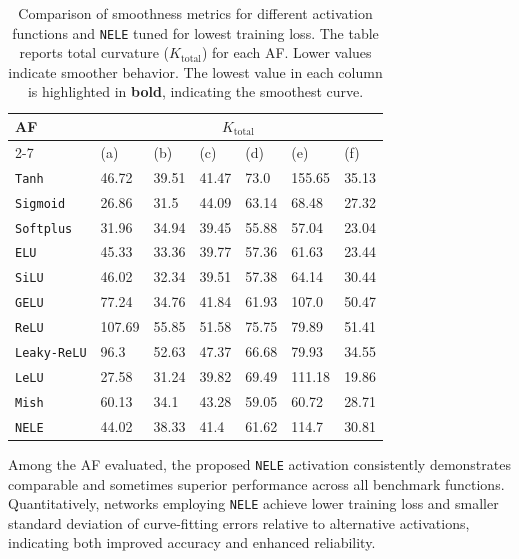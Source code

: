 \documentclass[11pt]{article}
\begin{document}
\begin{table}[h!]
\centering
\begin{tabular}{|l|llllll|}
\hline
\bfseries AF & \multicolumn{6}{c|}{\bfseries $K_\text{total}$} \\
\cline{2-7}
 & (a) & (b) & (c) & (d) & (e) & (f) \\
\hline
\texttt{Tanh} & 46.72 & 39.51 & 41.47 & 73.0 & 155.65 & 35.13 \\ 
\texttt{Sigmoid} & 26.86 & 31.5 & 44.09 & 63.14 & 68.48 & 27.32 \\ 
\texttt{Softplus} & 31.96 & 34.94 & 39.45 & 55.88 & 57.04 & 23.04 \\ 
\texttt{ELU} & 45.33 & 33.36 & 39.77 & 57.36 & 61.63 & 23.44 \\ 
\texttt{SiLU} & 46.02 & 32.34 & 39.51 & 57.38 & 64.14 & 30.44 \\ 
\texttt{GELU} & 77.24 & 34.76 & 41.84 & 61.93 & 107.0 & 50.47 \\ 
\texttt{ReLU} & 107.69 & 55.85 & 51.58 & 75.75 & 79.89 & 51.41 \\ 
\texttt{Leaky-ReLU} & 96.3 & 52.63 & 47.37 & 66.68 & 79.93 & 34.55 \\ 
\texttt{LeLU} & 27.58 & 31.24 & 39.82 & 69.49 & 111.18 & 19.86 \\ 
\texttt{Mish} & 60.13 & 34.1 & 43.28 & 59.05 & 60.72 & 28.71 \\ 
\texttt{NELE} & 44.02 & 38.33 & 41.4 & 61.62 & 114.7 & 30.81 \\ 
\hline
\end{tabular}
\caption{Comparison of smoothness metrics for different activation functions and \texttt{NELE} tuned for lowest training loss. 
The table reports total curvature ($K_\text{total}$) for each AF. 
Lower values indicate smoother behavior. The lowest value in each column 
is highlighted in \textbf{bold}, indicating the smoothest curve.}
\label{tab:smooth}
\end{table}
Among the AF evaluated, the proposed \texttt{NELE} activation 
consistently demonstrates comparable and sometimes superior performance across all benchmark functions. 
Quantitatively, networks employing \texttt{NELE} achieve lower training loss and smaller 
standard deviation of curve-fitting errors relative to alternative activations, 
indicating both improved accuracy and enhanced reliability.
\end{document}
